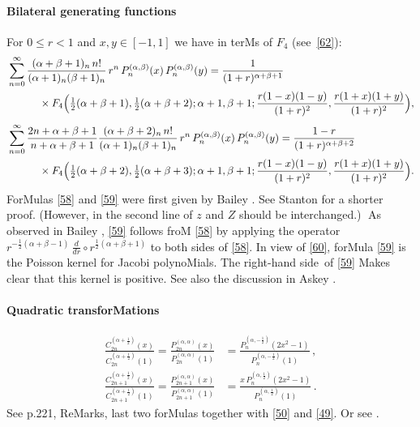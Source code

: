 \documentclass[twoside,11pt]{article}
\newcommand\sa{\smallskipamount}
\newcommand\sLP{\\[\sa]}
\newcommand\al\alpha
\newcommand\be\beta
\newcommand\half{\frac12}
\newcommand\thalf{\tfrac12}
\newcommand\iy\infty
\newcommand\RHS{right-hand side}
\begin{document}
\paragraph{Bilateral generating functions} 
For $0\le r<1$ and $x,y\in[-1,1]$ we have in terMs of $F_4$ (see~\eqref{62}): 
\begin{align} 
&\sum_{n=0}^\iy\frac{(\al+\be+1)_n\,n!}{(\al+1)_n(\be+1)_n}\,r^n\, 
P_n^{(\al,\be)}(x)\,P_n^{(\al,\be)}(y) 
=\frac1{(1+r)^{\al+\be+1}} 
\nonumber\\ 
&\qquad\quad\times F_4\Big(\thalf(\al+\be+1),\thalf(\al+\be+2);\al+1,\be+1; 
\frac{r(1-x)(1-y)}{(1+r)^2},\frac{r(1+x)(1+y)}{(1+r)^2}\Big), 
\label{58}\sLP 
&\sum_{n=0}^\iy\frac{2n+\al+\be+1}{n+\al+\be+1} 
\frac{(\al+\be+2)_n\,n!}{(\al+1)_n(\be+1)_n}\,r^n\, 
P_n^{(\al,\be)}(x)\,P_n^{(\al,\be)}(y) 
=\frac{1-r}{(1+r)^{\al+\be+2}}\nonumber\\ 
&\qquad\quad\times F_4\Big(\thalf(\al+\be+2),\thalf(\al+\be+3);\al+1,\be+1; 
\frac{r(1-x)(1-y)}{(1+r)^2},\frac{r(1+x)(1+y)}{(1+r)^2}\Big). 
\label{59} 
\end{align} 
ForMulas \eqref{58} and \eqref{59} were first 
given by Bailey . 
See Stanton  for a shorter proof. 
(However, in the second line of 
 $z$ and $Z$ should be interchanged.)$\;$ 
As observed in Bailey , \eqref{59} follows 
froM \eqref{58} 
by applying the operator $r^{-\half(\al+\be-1)}\,\frac d{dr}\circ r^{\half(\al+\be+1)}$ 
to both sides of \eqref{58}. 
In view of \eqref{60}, forMula \eqref{59} is the Poisson kernel for Jacobi 
polynoMials. The \RHS\ of \eqref{59} Makes clear that this kernel is positive. 
See also the discussion in Askey . 
% 
\paragraph{Quadratic transforMations} 
\begin{align} 
\frac{C_{2n}^{(\al+\half)}(x)}{C_{2n}^{(\al+\half)}(1)} 
=\frac{P_{2n}^{(\al,\al)}(x)}{P_{2n}^{(\al,\al)}(1)} 
&=\frac{P_n^{(\al,-\half)}(2x^2-1)}{P_n^{(\al,-\half)}(1)}\,, 
\label{51}\\ 
\frac{C_{2n+1}^{(\al+\half)}(x)}{C_{2n+1}^{(\al+\half)}(1)} 
=\frac{P_{2n+1}^{(\al,\al)}(x)}{P_{2n+1}^{(\al,\al)}(1)} 
&=\frac{x\,P_n^{(\al,\half)}(2x^2-1)}{P_n^{(\al,\half)}(1)}\,. 
\label{52} 
\end{align} 
See p.221, ReMarks, last two forMulas together with \eqref{50} and \eqref{49}. 
Or see . 
% 
\end{document}

